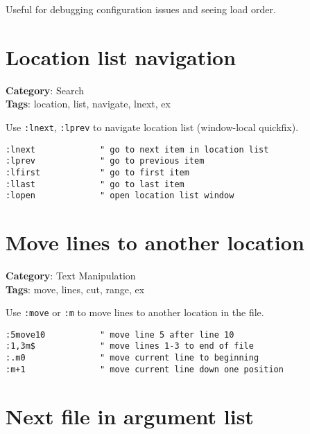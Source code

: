 {{{{{{Useful for debugging configuration issues and seeing load order.

\section{Location list navigation}

\textbf{Category}: Search\\ \textbf{Tags}: location, list, navigate, lnext, ex
\vspace{0.5cm}

Use {\footnotesize \Verb§:lnext§}, {\footnotesize \Verb§:lprev§} to navigate location list (window-local quickfix).

\begin{Exa*}{}
\begin{Verbatim}[fontsize=\footnotesize, breaklines, breakanywhere]
:lnext             " go to next item in location list
:lprev             " go to previous item
:lfirst            " go to first item
:llast             " go to last item
:lopen             " open location list window
\end{Verbatim}
\end{Exa*}

\section{Move lines to another location}

\textbf{Category}: Text Manipulation\\ \textbf{Tags}: move, lines, cut, range, ex
\vspace{0.5cm}

Use {\footnotesize \Verb§:move§} or {\footnotesize \Verb§:m§} to move lines to another location in the file.

\begin{Exa*}{}
\begin{Verbatim}[fontsize=\footnotesize, breaklines, breakanywhere]
:5move10           " move line 5 after line 10
:1,3m$             " move lines 1-3 to end of file
:.m0               " move current line to beginning
:m+1               " move current line down one position
\end{Verbatim}
\end{Exa*}

\section{Next file in argument list}

}}}}}}
